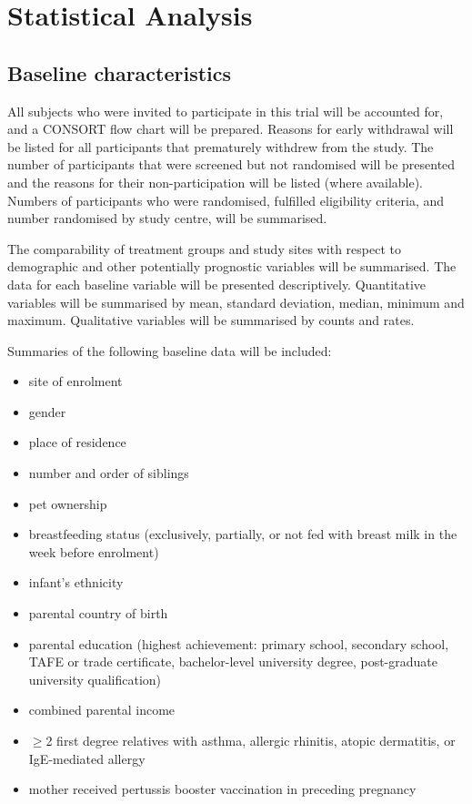 \documentclass{bmcart}
\begin{document}
\section*{Statistical Analysis}

\subsection*{Baseline characteristics}

All subjects who were invited to participate in this trial will be accounted for, and a CONSORT flow chart will be prepared.
Reasons for early withdrawal will be listed for all participants that prematurely withdrew from the study.
The number of participants that were screened but not randomised will be presented and the reasons for their non-participation will be listed (where available).
Numbers of participants who were randomised, fulfilled eligibility criteria, and number randomised by study centre, will be summarised.

The comparability of treatment groups and study sites with respect to demographic and other potentially prognostic variables will be summarised.
The data for each baseline variable will be presented descriptively.
Quantitative variables will be summarised by mean, standard deviation, median, minimum and maximum.
Qualitative variables will be summarised by counts and rates.

Summaries of the following baseline data will be included:

\begin{itemize}
	\item site of enrolment
	\item gender
	\item place of residence
	\item number and order of siblings
	\item pet ownership
	\item breastfeeding status (exclusively, partially, or not fed with breast milk in the week before enrolment)
	\item infant's ethnicity
	\item parental country of birth
	\item parental education (highest achievement: primary school, secondary school, TAFE or trade certificate, bachelor-level university degree, post-graduate university qualification)
	\item combined parental income
	\item $\geq$2 first degree relatives with asthma, allergic rhinitis, atopic dermatitis, or IgE-mediated allergy
	\item mother received pertussis booster vaccination in preceding pregnancy
\end{itemize}
\end{document}
